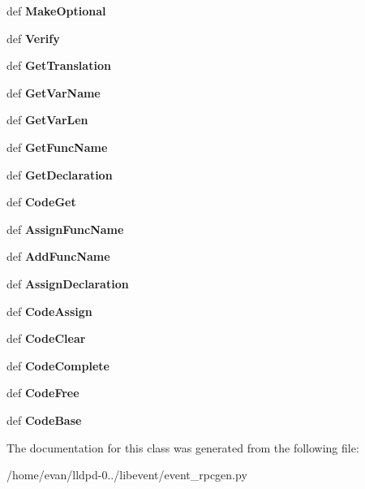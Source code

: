 \begin{DoxyCompactItemize}
\item 
def {\bfseries \-Make\-Optional}\label{classevent__rpcgen_1_1_entry_a37edf4ec6ae76d311487016120a304d3}

\item 
def {\bfseries \-Verify}\label{classevent__rpcgen_1_1_entry_a893afc80bb2301a1f65c3a46e79580e0}

\item 
def {\bfseries \-Get\-Translation}\label{classevent__rpcgen_1_1_entry_a2fe68b7b10e68bb612069eb1cc612823}

\item 
def {\bfseries \-Get\-Var\-Name}\label{classevent__rpcgen_1_1_entry_a2b46f130190c9ebd880326fad4c936c5}

\item 
def {\bfseries \-Get\-Var\-Len}\label{classevent__rpcgen_1_1_entry_a08d14096a163fb84ee8c3536eab2ff47}

\item 
def {\bfseries \-Get\-Func\-Name}\label{classevent__rpcgen_1_1_entry_ae6678385d79205be6642d6067c30552f}

\item 
def {\bfseries \-Get\-Declaration}\label{classevent__rpcgen_1_1_entry_a466f7ed549f8de6974add96c9ebf1d09}

\item 
def {\bfseries \-Code\-Get}\label{classevent__rpcgen_1_1_entry_ac4f27f4fd487ba8b17807758ea0b5234}

\item 
def {\bfseries \-Assign\-Func\-Name}\label{classevent__rpcgen_1_1_entry_aca88ae5df2f5e3ad22d83b22e8f599d5}

\item 
def {\bfseries \-Add\-Func\-Name}\label{classevent__rpcgen_1_1_entry_a7fbdd003fded912514261142e2f4c11a}

\item 
def {\bfseries \-Assign\-Declaration}\label{classevent__rpcgen_1_1_entry_a415190be3c5f4dde7128f492d38a2196}

\item 
def {\bfseries \-Code\-Assign}\label{classevent__rpcgen_1_1_entry_a6b6a08cd00ffadb276d29fcbf0dc3bfc}

\item 
def {\bfseries \-Code\-Clear}\label{classevent__rpcgen_1_1_entry_a7b18b6858614ca342000830c02218696}

\item 
def {\bfseries \-Code\-Complete}\label{classevent__rpcgen_1_1_entry_a72a2652b6d341ea05be549a6657a43e9}

\item 
def {\bfseries \-Code\-Free}\label{classevent__rpcgen_1_1_entry_a81ad9b6c3af1d0fe115d2b2e54ee8a17}

\item 
def {\bfseries \-Code\-Base}\label{classevent__rpcgen_1_1_entry_ac84cf0c903130145af15be41bbe32036}

\end{DoxyCompactItemize}


\-The documentation for this class was generated from the following file\-:\begin{DoxyCompactItemize}
\item 
/home/evan/lldpd-\/0../libevent/event\-\_\-rpcgen.\-py\end{DoxyCompactItemize}
